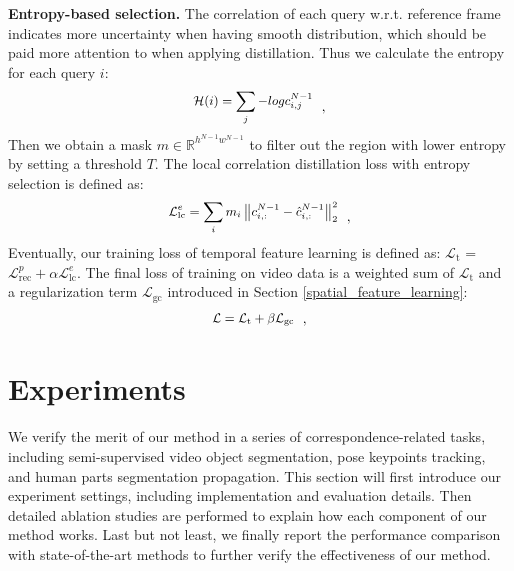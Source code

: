 \documentclass{article}
\begin{document}
\textbf{Entropy-based selection.} The correlation of each query w.r.t. reference frame indicates more uncertainty when having smooth distribution, which should be paid more attention to when applying distillation. Thus we calculate the entropy for each query $i$:
\begin{equation}\label{eq:pyramid reconstruction loss}
  \small
  \begin{aligned}
    \mathcal{H}(i)=\sum_j-log c^{N-1}_{i,j}
  \end{aligned}~~,
\end{equation}
Then we obtain a mask $m \in \mathbb{R}^{h^{N-1}w^{N-1}}$ to filter out the region with lower entropy by setting a threshold $T$. The local correlation distillation loss with entropy selection is defined as:
\begin{equation}\label{eq:reconstruction loss}
  \small
  \begin{aligned}
    \mathcal{L}^e_{\mathrm{lc}}=\sum_im_i\left\|c_{i,:}^{N-1}-\hat{c}^{N-1}_{i,:}\right\|^2_{2}
  \end{aligned}~~,
\end{equation}
Eventually, our training loss of temporal feature learning is defined as: $\mathcal{L}_\mathrm{t}$ =  $\mathcal{L}^p_{\mathrm{rec}} + \alpha  \mathcal{L}^e_{\mathrm{lc}}$. The final loss of training on video data is a weighted sum of  $\mathcal{L}_\mathrm{t}$ and a regularization term $\mathcal{L}_\mathrm{gc}$ introduced in Section \ref{spatial_feature_learning}:
\begin{equation}\label{eq:final loss}
  \small
  \begin{aligned}
    \mathcal{L} = \mathcal{L}_{\mathrm{t}}  + \beta  \mathcal{L}_{\mathrm{gc}}
  \end{aligned}~~,
\end{equation}


\section{Experiments}
We verify the merit of our method in a series of correspondence-related tasks, including semi-supervised video object segmentation, pose keypoints tracking, and human parts segmentation propagation. This section will first introduce our experiment settings, including implementation and evaluation details. Then detailed ablation studies are performed to explain how each component of our method works. Last but not least, we finally report the performance comparison with state-of-the-art methods to further verify the effectiveness of our method.
\end{document}
